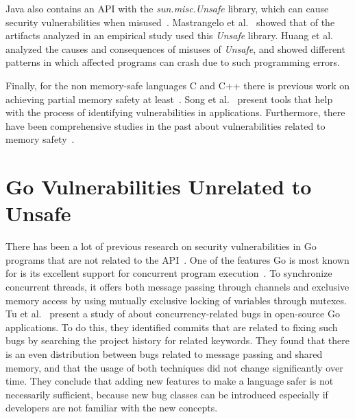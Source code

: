 Java also contains an \unsafe{} API with the \textit{sun.misc.Unsafe} library, which can cause security vulnerabilities
when misused~\cite{mastrangelo2019}.
Mastrangelo et al.~\cite{mastrangelo2015} showed that  of the artifacts analyzed in an empirical study
used this \textit{Unsafe} library.
Huang et al.~\cite{huang2019} analyzed the causes and consequences of misuses of \textit{Unsafe}, and showed different
patterns in which affected programs can crash due to such programming errors.

Finally, for the non memory-safe languages C and C++ there is previous work on achieving partial memory safety at
least~\cite{burow2018, nagarakatte2009}.
Song et al.~\cite{song2019} present tools that help with the process of identifying vulnerabilities in applications.
Furthermore, there have been comprehensive studies in the past about vulnerabilities related to memory
safety~\cite{szekeres2013,alnaeli2017,larochelle2001}.



\section{Go Vulnerabilities Unrelated to Unsafe}\label{sec:related-work:other-go-vulnerabilities}

There has been a lot of previous research on security vulnerabilities in Go programs that are not related to the
\unsafe{} \acrshort{API}~\cite{zhou2017, hill2002, hannan1998, choi1999}.
One of the features Go is most known for is its excellent support for concurrent program execution~\cite{donovan2015}.
To synchronize concurrent threads, it offers both message passing through channels and exclusive memory access by using
mutually exclusive locking of variables through mutexes.
Tu et al.~\cite{tu2019} present a study of about  concurrency-related bugs in  open-source
Go applications.
To do this, they identified commits that are related to fixing such bugs by searching the project history for related
keywords.
They found that there is an even distribution between bugs related to message passing and shared memory, and that the
usage of both techniques did not change significantly over time.
They conclude that adding new features to make a language safer is not necessarily sufficient, because new bug classes
can be introduced especially if developers are not familiar with the new concepts.

